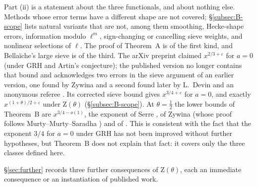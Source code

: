 \documentclass[11pt]{amsart}
\theoremstyle{definition}
\theoremstyle{remark}
\newcommand{\Zt}{\mathrm{Z}}       %
\begin{document}
Part (ii) is a statement about the three functionals, and about nothing else. Methods whose error terms have a
different shape are not covered; \S\ref{subsec:B-scope} lists natural variants that are not, among them smoothing,
Hecke-shape errors, information modulo $\ell^m$, sign-changing or cancelling sieve weights, and nonlinear selections
of $\ell$. The proof of Theorem~A is of the first kind, and Bella\"iche's large sieve \cite[Thm.~14]{Bel16} is of the
third. The arXiv preprint \cite{Bel13} claimed $x^{2/3+\varepsilon}$ for $a=0$ (under GRH and Artin's conjecture);
the published version \cite{Bel16} no longer contains that bound and acknowledges two errors in the sieve argument of
an earlier version, one found by Zywina and a second found later by L.~Devin and an anonymous referee
\cite[introduction and Rem.~18(i)]{Bel16}. Its corrected sieve bound gives $x^{3/4+\varepsilon}$ for
$a=0$, and exactly $x^{(1+\theta)/2+\varepsilon}$ under $\Zt(\theta)$ (\S\ref{subsec:B-scope}). At $\theta=\frac12$
the lower bounds of Theorem~B are $x^{3/4-o(1)}$, the exponent of Serre \cite{Serre81}, of Zywina \cite{Zyw15} (whose
proof follows Murty--Murty--Saradha \cite{MMS}) and of \cite[Cor.~15]{Bel16}. This is consistent with the fact that the exponent $3/4$ for
$a=0$ under GRH has not been improved without further hypotheses, but Theorem~B does not explain that fact: it covers
only the three classes defined here.

\S\ref{sec:further} records three further consequences of $\Zt(\theta)$, each an immediate consequence or an
instantiation of published work.
\end{document}
